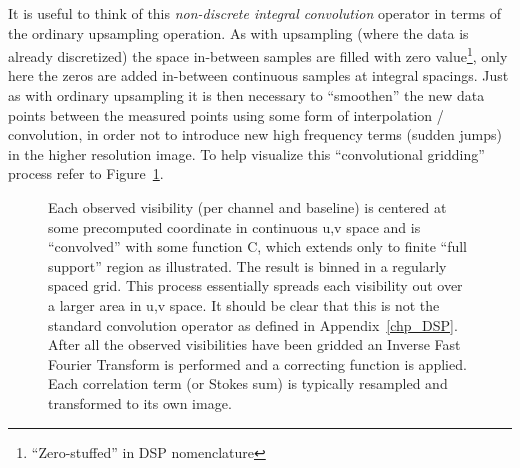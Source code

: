  It is useful to think of this \emph{non-discrete integral convolution} operator in terms of the ordinary upsampling operation. As with upsampling (where
 the data is already discretized) the space in-between samples are filled with zero value\footnote{``Zero-stuffed'' in DSP nomenclature}, only here the zeros
 are added in-between continuous samples at integral spacings. Just as with ordinary upsampling it is then necessary to ``smoothen'' the new data points 
 between the measured points using some form of interpolation / convolution, in order not to introduce new high frequency terms (sudden jumps) in the 
 higher resolution image. To help visualize this ``convolutional gridding'' process refer to Figure~\ref{fig_gridding}.
 \begin{figure}[h]
  \begin{mdframed}
   \caption[Illustration of convolutional gridding]{Each observed visibility (per channel and baseline) is centered at some precomputed coordinate in continuous u,v space and 
    is ``convolved'' with some function C, which extends only to finite ``full support'' region as illustrated. The result is binned in a regularly spaced grid. 
    This process essentially spreads each visibility out over a larger area in u,v space. It should be clear that this is not the standard convolution 
    operator as defined in Appendix~\ref{chp_DSP}. After all the observed visibilities have been gridded an Inverse Fast Fourier Transform is performed 
    and a correcting function is applied. Each correlation term (or Stokes sum) is typically resampled and transformed to its own image.}
   \label{fig_gridding}
  \end{mdframed}
 \end{figure}
 
